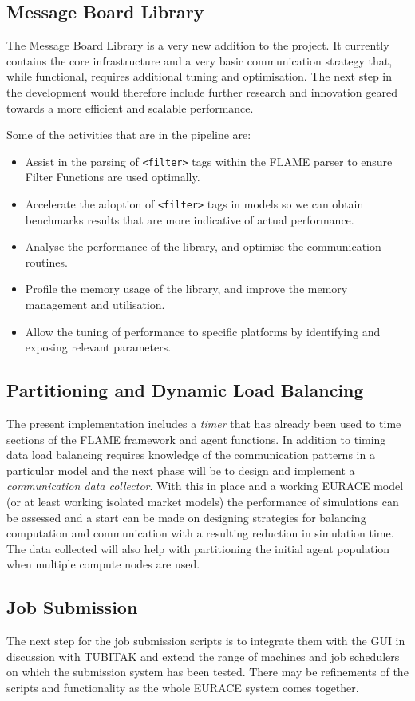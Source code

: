 \subsection{Message Board Library}

The Message Board Library is a very new addition to the project. It currently contains the core infrastructure and a very basic communication strategy that, while functional, requires additional tuning and optimisation. The next step in the development would therefore include further research and innovation geared towards a more efficient and scalable performance. 

Some of the activities that are in the pipeline are:
\begin{itemize}
\item Assist in the parsing of \texttt{<filter>} tags within the FLAME parser to ensure Filter Functions are used optimally.
\item Accelerate the adoption of \texttt{<filter>} tags in models so we can obtain benchmarks results that are more indicative of actual performance.
\item Analyse the  performance of the library, and optimise the communication routines.
\item Profile the memory usage of the library, and improve the memory management and utilisation.
\item Allow the tuning of performance to specific platforms by identifying and exposing relevant parameters.
\end{itemize} 

\subsection{Partitioning and Dynamic Load Balancing}

The present implementation includes a \textit{timer} that has already been used to time sections of the FLAME framework and agent functions. In addition to timing data load balancing requires knowledge of the communication patterns in a particular model and the next phase will be to design and implement a \textit{communication data collector}. With this in place and a working EURACE model (or at least working isolated market models) the performance of simulations can be assessed and a start can be made on designing strategies for balancing computation and communication with a resulting reduction in simulation time. The data collected will also help with partitioning the initial agent population when multiple compute nodes are used.

\subsection{Job Submission}

The next step for the job submission scripts is to integrate them with the GUI in discussion with TUBITAK and extend the range of machines and job schedulers on which the submission system has been tested. There may be refinements of the scripts and functionality as the whole EURACE system comes together. 
